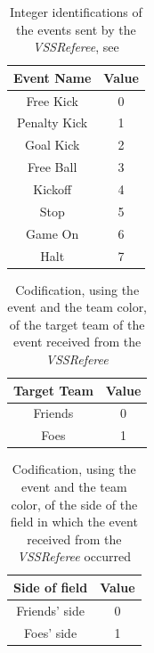 \begin{table}[!htbp]
    \centering
    \begin{tabular}{c c}
        \toprule
        Event Name   & Value \\
        \midrule
        Free Kick    & 0     \\
        Penalty Kick & 1     \\
        Goal Kick    & 2     \\
        Free Ball    & 3     \\
        Kickoff      & 4     \\
        Stop         & 5     \\
        Game On      & 6     \\
        Halt         & 7     \\
        \bottomrule
    \end{tabular}
    \caption{Integer identifications of the events sent by the \textit{VSSReferee}, see \cite{VSSProto}}
    \label{tab:referee_events_ids}
\end{table}

\begin{table}[!htbp]
    \centering
    \begin{tabular}{c c}
        \toprule
        Target Team & Value \\
        \midrule
        Friends     & 0     \\
        Foes        & 1     \\
        \bottomrule
    \end{tabular}
    \caption{Codification, using the event and the team color, of the target team of the event received from the \textit{VSSReferee}}
    \label{tab:target_team_event_codification}
\end{table}

\begin{table}[!htbp]
    \centering
    \begin{tabular}{c c}
        \toprule
        Side of field & Value \\
        \midrule
        Friends' side & 0     \\
        Foes' side    & 1     \\
        \bottomrule
    \end{tabular}
    \caption{Codification, using the event and the team color, of the side of the field in which the event received from the \textit{VSSReferee} occurred}
    \label{tab:field_side_event_codification}
\end{table}

